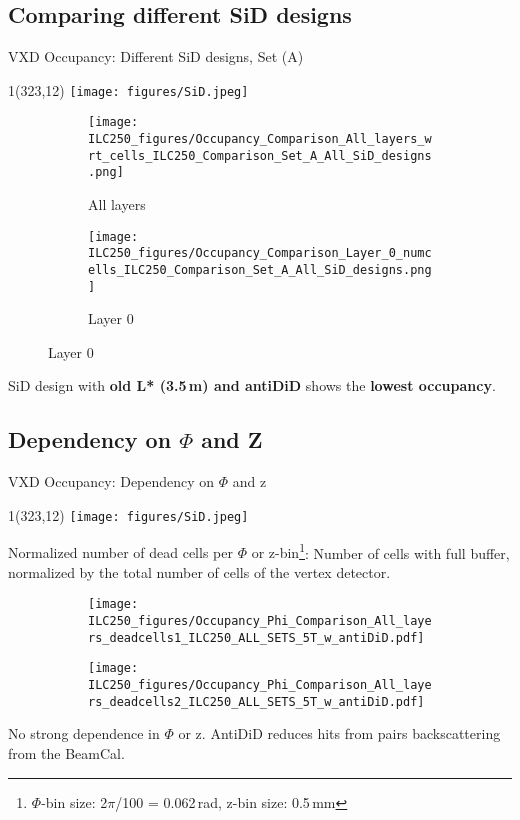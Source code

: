 \documentclass[xcolor={dvipsnames}]{beamer}
\newcommand{\sidlogo}{
  \setlength{\TPHorizModule}{1pt}
  \setlength{\TPVertModule}{1pt}
  \begin{textblock}{1}(323,12)
   \texttt{[image: figures/SiD.jpeg]}
  \end{textblock}
  }
\begin{document}
\subsection{Comparing different SiD designs}
\begin{frame}{VXD Occupancy: Different SiD designs, Set (A)}
\sidlogo

\begin{figure}
\centering
\begin{subfigure}[t]{0.48\textwidth}
\centering
\texttt{[image: ILC250\_figures/Occupancy\_Comparison\_All\_layers\_wrt\_cells\_ILC250\_Comparison\_Set\_A\_All\_SiD\_designs.png]}
\caption{\alert{All layers}}
 \end{subfigure}
\hspace*{0.2cm}
\begin{subfigure}[t]{0.48\textwidth}
\centering
\texttt{[image: ILC250\_figures/Occupancy\_Comparison\_Layer\_0\_numcells\_ILC250\_Comparison\_Set\_A\_All\_SiD\_designs.png]}
\caption{\alert{Layer 0}}
\end{subfigure}
\end{figure}
\normalsize SiD design with \textbf{old L* (3.5\,m) and antiDiD} shows the \textbf{lowest occupancy}.
\end{frame}

\subsection{Dependency on $\Phi$ and Z}
\begin{frame}{VXD Occupancy: Dependency on $\Phi$ and z}
\sidlogo
\alert{Normalized number of dead cells per $\Phi$ or z-bin}\footnote{$\Phi$-bin size: 2$\pi$/100 = 0.062\,rad, z-bin size: 0.5\,mm}: Number of cells with full buffer, normalized by the total number of cells of the vertex detector.
\begin{figure}
\centering
\begin{subfigure}[t]{0.48\textwidth}
\centering
\texttt{[image: ILC250\_figures/Occupancy\_Phi\_Comparison\_All\_layers\_deadcells1\_ILC250\_ALL\_SETS\_5T\_w\_antiDiD.pdf]}
 \end{subfigure}
\hspace*{0.2cm}
\begin{subfigure}[t]{0.48\textwidth}
\centering
\texttt{[image: ILC250\_figures/Occupancy\_Phi\_Comparison\_All\_layers\_deadcells2\_ILC250\_ALL\_SETS\_5T\_w\_antiDiD.pdf]}
\end{subfigure}
\end{figure}
No strong dependence in $\Phi$ or z. AntiDiD reduces hits from pairs backscattering from the BeamCal.
\end{frame}
\end{document}
